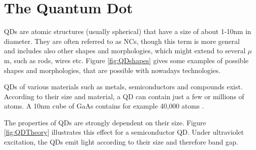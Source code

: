 \chapter{The Quantum Dot} \label{sec:QuantumDot} 

	\glspl{QD} are atomic structures (usually spherical) that have a size of about 1-10nm in diameter. They are often referred to as \glspl{NC}, though this
	term is more general and includes also other shapes and morphologies, which might extend to several $\mu$m, such as rods, wires etc.
	Figure \ref{fig:QDshapes} gives some examples of possible shapes and morphologies, that are possible with nowadays technologies.
	
	\glspl{QD} of various materials such as metals, semiconductors and compounds exist. According to their size and material,
	a \gls{QD} can contain just a few or millions of atoms. A 10nm cube of GaAs contains for example 40,000 atoms \cite{SalehTeich}.
	
	The properties of \glspl{QD} are strongly dependent on their size. Figure \ref{fig:QDTheory} illustrates this effect for a semiconductor \gls{QD}.
	Under ultraviolet excitation, the \glspl{QD} emit light according to their size and therefore band gap.
	
